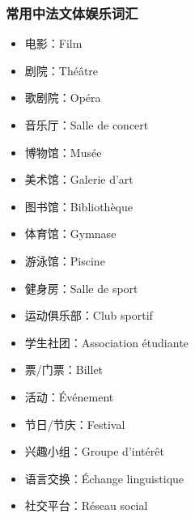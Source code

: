 \subsubsection{常用中法文体娱乐词汇}
\begin{itemize}
    \item 电影：Film
    \item 剧院：Théâtre
    \item 歌剧院：Opéra
    \item 音乐厅：Salle de concert
    \item 博物馆：Musée
    \item 美术馆：Galerie d’art
    \item 图书馆：Bibliothèque
    \item 体育馆：Gymnase
    \item 游泳馆：Piscine
    \item 健身房：Salle de sport
    \item 运动俱乐部：Club sportif
    \item 学生社团：Association étudiante
    \item 票/门票：Billet
    \item 活动：Événement
    \item 节日/节庆：Festival
    \item 兴趣小组：Groupe d’intérêt
    \item 语言交换：Échange linguistique
    \item 社交平台：Réseau social
\end{itemize}
